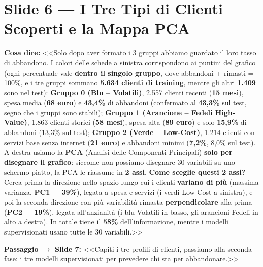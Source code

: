 \documentclass[10pt, a4paper]{article}
\newcommand{\say}[1]{%
  \par\vspace{2pt}\noindent\colorbox{SoftBox}{\parbox{\dimexpr\linewidth-2\fboxsep}{\raggedright\small\textbf{\color{PrimaryNavy}Cosa dire:} #1}}\par\vspace{2pt}%
}
\newcommand{\pass}[2]{%
  \par\vspace{1pt}\noindent\colorbox{PassBox}{\parbox{\dimexpr\linewidth-2\fboxsep}{\raggedright\footnotesize\textbf{\color{AccentAmber}Passaggio $\rightarrow$ Slide #1:} <<#2>>}}\par%
}
\newcommand{\slideblock}[3]{%
  \noindent\begin{minipage}{\linewidth}
    \section*{#1}
    \say{#2}
    #3
  \end{minipage}\par\vspace{6pt}%
}
\begin{document}
\slideblock{Slide 6 --- I Tre Tipi di Clienti Scoperti e la Mappa PCA}{%
<<Solo dopo aver formato i 3 gruppi abbiamo guardato il loro tasso di abbandono. I colori delle schede a sinistra corrispondono ai puntini del grafico (ogni percentuale vale \textbf{dentro il singolo gruppo}, dove abbandoni + rimasti = 100\%, e i tre gruppi sommano \textbf{5.634 clienti di training}, mentre gli altri \textbf{1.409} sono nel test): \textbf{Gruppo 0 (Blu -- Volatili)}, 2.557 clienti recenti (\textbf{15 mesi}), spesa media (\textbf{68 euro}) e \textbf{43,4\%} di abbandoni (confermato al \textbf{43,3\%} sul test, segno che i gruppi sono stabili); \textbf{Gruppo 1 (Arancione -- Fedeli High-Value)}, 1.863 clienti storici (\textbf{58 mesi}), spesa alta (\textbf{89 euro}) e solo \textbf{15,9\%} di abbandoni (13,3\% sul test); \textbf{Gruppo 2 (Verde -- Low-Cost)}, 1.214 clienti con servizi base senza internet (\textbf{21 euro}) e abbandoni minimi (\textbf{7,2\%}, 8,0\% sul test). A destra usiamo la \textbf{PCA} (Analisi delle Componenti Principali) \textbf{solo per disegnare il grafico}: siccome non possiamo disegnare 30 variabili su uno schermo piatto, la PCA le riassume in \textbf{2 assi}. \textbf{Come sceglie questi 2 assi?} Cerca prima la direzione nello spazio lungo cui i clienti \textbf{variano di più} (massima varianza, \textbf{PC1 = 39\%}), legata a spesa e servizi (i verdi Low-Cost a sinistra), e poi la seconda direzione con più variabilità rimasta \textbf{perpendicolare} alla prima (\textbf{PC2 = 19\%}), legata all'anzianità (i blu Volatili in basso, gli arancioni Fedeli in alto a destra). In totale tiene il \textbf{58\%} dell'informazione, mentre i modelli supervisionati usano tutte le 30 variabili.>>%
}{\pass{7}{Capiti i tre profili di clienti, passiamo alla seconda fase: i tre modelli supervisionati per prevedere chi sta per abbandonare.}}
\end{document}
